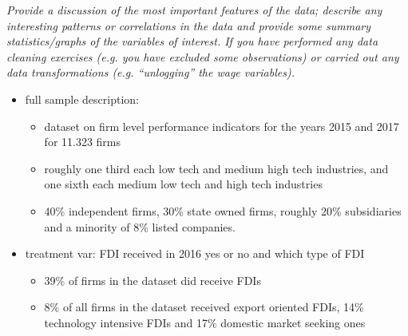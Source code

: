 \textit{Provide a discussion of the most important features of the data; describe any interesting patterns or correlations in the data and provide some summary statistics/graphs of the variables of interest. If you have performed any data cleaning exercises (e.g. you have excluded some observations) or carried out any data transformations (e.g. “unlogging” the wage variables).}

\begin{itemize}
	\item full sample description:
	\begin{itemize}
		\item dataset on firm level performance indicators for the years 2015 and 2017 for 11.323 firms  
		\item roughly one third each low tech and medium high tech industries, and one sixth each medium low tech and high tech industries
		\item 40\% independent firms, 30\% state owned firms, roughly 20\% subsidiaries and a minority of 8\% listed companies.  
	\end{itemize}
	\item treatment var: FDI received in 2016 yes or no and which type of FDI
	\begin{itemize}
		\item 39\% of firms in the dataset did receive FDIs
		\item 8\% of all firms in the dataset received export oriented FDIs, 14\% technology intensive FDIs and 17\% domestic market seeking ones
	\end{itemize}

\end{itemize}
